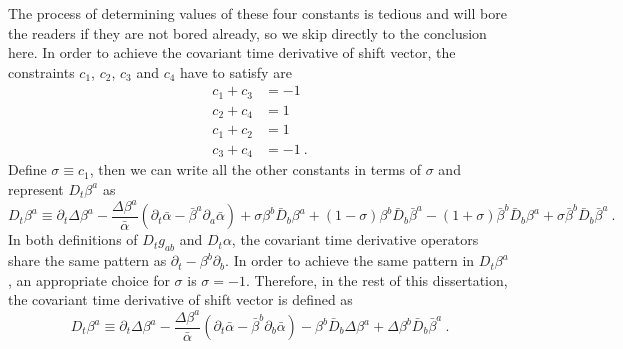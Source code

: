 The process of determining values of these four constants is tedious and will bore the readers if they are not bored already, so we skip directly to the conclusion here. In order to achieve the covariant time derivative of shift vector, the constraints $c_{1}$, $c_{2}$, $c_{3}$ and $c_{4}$ have to satisfy are
\begin{align*}
c_{1} + c_{3} & = -1\\
c_{2} + c_{4} & = 1\\
c_{1} + c_{2} & = 1\\
c_{3} + c_{4} & = -1 \ .
\end{align*}
Define $\sigma \equiv c_{1}$, then we can write all the other constants in terms of $\sigma$ and represent $D_{t}\beta^{a}$ as
\begin{equation}
	D_{t}\beta^{a} \equiv \partial_{t}\Delta \beta^{a} - \frac{\Delta \beta^{a}}{{\bar \alpha}}\left(\partial_{t}{\bar \alpha} - {\bar \beta}^{a}\partial_{a}{\bar \alpha}\right) + \sigma\beta^{b}{\bar D}_{b}\beta^{a} + \left(1-\sigma\right)\beta^{b}{\bar D}_{b}{\bar \beta}^{a} - \left(1 + \sigma\right){\bar \beta}^{b}{\bar D}_{b}\beta^{a} + \sigma{\bar \beta}^{b}{\bar D}_{b}{\bar \beta}^{a} \ .
\end{equation}
In both definitions of $D_{t}g_{ab}$ and $D_{t}\alpha$, the covariant time derivative operators share the same pattern as $\partial_{t} - \beta^{b}\partial_{b}$. In order to achieve the same pattern in $D_{t}\beta^{a}$, an appropriate choice for $\sigma$ is $\sigma = -1$. Therefore, in the rest of this dissertation, the covariant time derivative of shift vector is defined as
\begin{equation}\label{shiftcovarianttimederivative}
	D_{t}\beta^{a} \equiv \partial_{t}\Delta \beta^{a} - \frac{\Delta \beta^{a}}{{\bar \alpha}}\left(\partial_{t}{\bar \alpha} - {\bar \beta}^{b}\partial_{b}{\bar \alpha}\right) - \beta^{b}{\bar D}_{b}\Delta \beta^{a} + \Delta \beta^{b}{\bar D}_{b}{\bar \beta}^{a} \ .	
\end{equation}

